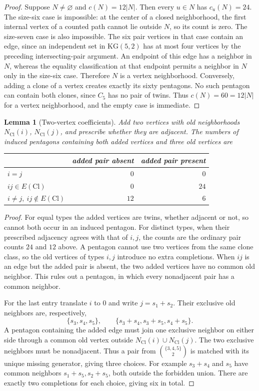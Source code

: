 \documentclass[11pt]{amsart}
\newtheorem{lemma}[theorem]{Lemma}
\theoremstyle{definition}
\theoremstyle{remark}
\begin{document}
\begin{proof}
Suppose $N\ne\varnothing$ and $c(N)=12|N|$. Then every $u\in N$ has
$c_u(N)=24$. The size-six case is impossible: at the center of a closed
neighborhood, the first internal vertex of a counted path cannot lie
outside $N$, so its count is zero. The size-seven case is also
impossible. The six pair vertices in that case contain an edge, since
an independent set in $\mathrm{KG}(5,2)$ has at most four vertices by
the preceding intersecting-pair argument. An endpoint of this edge has
a neighbor in $N$, whereas the equality classification at that endpoint
permits a neighbor in $N$ only in the size-six case. Therefore $N$ is
a vertex neighborhood. Conversely, adding a clone of a vertex creates
exactly its sixty pentagons. No such pentagon can contain both clones,
since $C_5$ has no pair of twins. Thus $c(N)=60=12|N|$ for a vertex
neighborhood, and the empty case is immediate.
\end{proof}

\begin{lemma}[Two-vertex coefficients]\label{lem:two-vertex}
Add two vertices with old neighborhoods $N_{\mathrm{Cl}}(i)$,
$N_{\mathrm{Cl}}(j)$, and prescribe whether they are adjacent. The
numbers of induced pentagons containing both added vertices and three
old vertices are
\begin{center}
\begin{tabular}{lrr}
\toprule
&added pair absent&added pair present\\
\midrule
$i=j$&$0$&$0$\\
$ij\in E(\mathrm{Cl})$&$0$&$24$\\
$i\ne j,\ ij\notin E(\mathrm{Cl})$&$12$&$6$\\
\bottomrule
\end{tabular}
\end{center}
\end{lemma}
\begin{proof}
For equal types the added vertices are twins, whether adjacent or not,
so cannot both occur in an induced pentagon. For distinct types, when
their prescribed adjacency agrees with that of $i,j$, the counts are
the ordinary pair counts $24$ and $12$ above. A pentagon cannot use
two vertices from the same clone class, so the old vertices of types
$i,j$ introduce no extra completions. When $ij$ is an edge but the
added pair is absent, the two added vertices have no common old
neighbor. This rules out a pentagon, in which every nonadjacent pair
has a common neighbor.

For the last entry translate $i$ to $0$ and write $j=s_1+s_2$. Their
exclusive old neighbors are, respectively,
\[
 \{s_3,s_4,s_5\},\qquad
 \{s_3+s_4,s_3+s_5,s_4+s_5\}.
\]
A pentagon containing the added edge must join one exclusive neighbor
on either side through a common old vertex outside
$N_{\mathrm{Cl}}(i)\cup N_{\mathrm{Cl}}(j)$. The two exclusive
neighbors must be nonadjacent. Thus a pair from
$\binom{\{3,4,5\}}{2}$ is matched with its unique missing generator,
giving three choices. For example $s_3+s_4$ and $s_5$ have common
neighbors $s_1+s_5,s_2+s_5$, both outside the forbidden union. There
are exactly two completions for each choice, giving six in total.
\end{proof}
\end{document}

